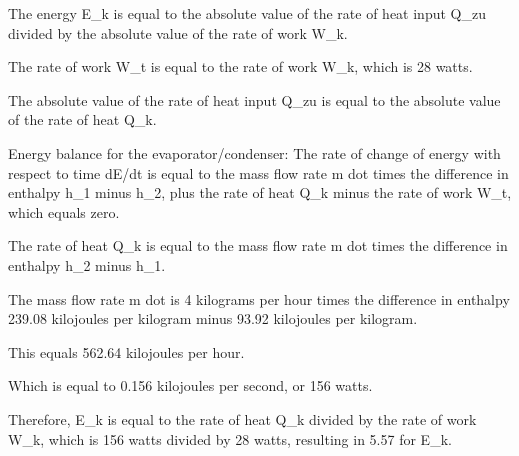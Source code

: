 The energy E_k is equal to the absolute value of the rate of heat input Q_zu divided by the absolute value of the rate of work W_k.

The rate of work W_t is equal to the rate of work W_k, which is 28 watts.

The absolute value of the rate of heat input Q_zu is equal to the absolute value of the rate of heat Q_k.

Energy balance for the evaporator/condenser:
The rate of change of energy with respect to time dE/dt is equal to the mass flow rate m dot times the difference in enthalpy h_1 minus h_2, plus the rate of heat Q_k minus the rate of work W_t, which equals zero.

The rate of heat Q_k is equal to the mass flow rate m dot times the difference in enthalpy h_2 minus h_1.

The mass flow rate m dot is 4 kilograms per hour times the difference in enthalpy 239.08 kilojoules per kilogram minus 93.92 kilojoules per kilogram.

This equals 562.64 kilojoules per hour.

Which is equal to 0.156 kilojoules per second, or 156 watts.

Therefore, E_k is equal to the rate of heat Q_k divided by the rate of work W_k, which is 156 watts divided by 28 watts, resulting in 5.57 for E_k.